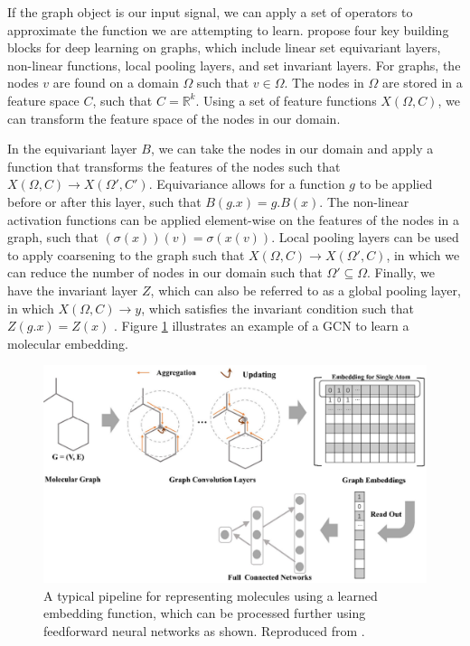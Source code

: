 If the graph object is our input signal, we can apply a set of operators to approximate the function we are attempting to learn. \citet{bronstein2021geometric} propose four key building blocks for deep learning on graphs, which include linear set equivariant layers, non-linear functions, local pooling layers, and set invariant layers. For graphs, the nodes $v$ are found on a domain $\Omega$ such that $v \in \Omega$. The nodes in $\Omega$ are stored in a feature space $C$, such that $C = \mathbb{R}^k$. Using a set of feature functions $X(\Omega, C)$, we can transform the feature space of the nodes in our domain. 

In the equivariant layer $B$, we can take the nodes in our domain and apply a function that transforms the features of the nodes such that $X(\Omega, C) \rightarrow X(\Omega', C')$. Equivariance allows for a function $g$ to be applied before or after this layer, such that $B(g.x) = g.B(x)$. The non-linear activation functions can be applied element-wise on the features of the nodes in a graph, such that $(\sigma(x))(v) = \sigma(x(v))$. Local pooling layers can be used to apply coarsening to the graph such that $X(\Omega, C) \rightarrow X(\Omega', C)$, in which we can reduce the number of nodes in our domain such that $\Omega' \subseteq \Omega$. Finally, we have the invariant layer $Z$, which can also be referred to as a global pooling layer, in which $X(\Omega, C) \rightarrow y$, which satisfies the invariant condition such that $Z(g.x) = Z(x)$ \citep{bronstein2021geometric}. Figure \ref{fig:neuralgraphfingerprint} illustrates an example of a GCN to learn a molecular embedding.

\begin{figure}[h]
    \centering
    \includegraphics[width=0.9\linewidth]{img/graph_mol_embedding.png}
    \caption[Learned Embedding through a GCN]{A typical pipeline for representing molecules using a learned embedding function, which can be processed further using feedforward neural networks as shown. Reproduced from \citet{jiang2021could}.}
    \label{fig:neuralgraphfingerprint}
  \end{figure}

